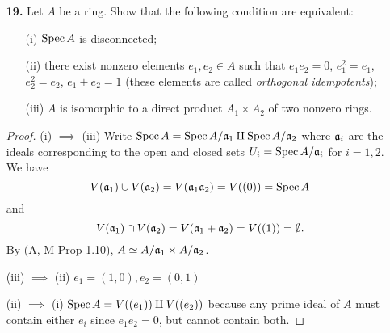 \documentclass{article}
\begin{document}
\begin{enumerate} [label=\textbf{\arabic*.}, leftmargin=0em]
\item[\textbf{19.}] Let $A$ be a ring. Show that the following condition are equivalent:
\begin{itemize}
    \item[(i)] $\operatorname{Spec}{A}$ is disconnected;
    \item[(ii)] there exist nonzero elements $e_1, e_2 \in A$ such that $e_1 e_2 = 0$, $e_1^2 = e_1$, $e_2^2 = e_2$, $e_1 + e_2 = 1$ (these elements are called \textit{orthogonal idempotents});
    \item[(iii)] $A$ is isomorphic to a direct product $A_1 \times A_2$ of two nonzero rings.
\end{itemize}

\begin{proof}
    (i) $\implies$ (iii) Write $\operatorname{Spec}{A} = \operatorname{Spec}{A/\mathfrak{a}_1} \amalg \operatorname{Spec}{A/\mathfrak{a}_2}$ where $\mathfrak{a}_i$ are the ideals corresponding to the open and closed sets $U_i = \operatorname{Spec}{A/\mathfrak{a}_i}$ for $i = 1, 2$. We have $$V(\mathfrak{a}_1) \cup V(\mathfrak{a}_2) = V(\mathfrak{a}_1 \mathfrak{a}_2 ) = V((0)) = \operatorname{Spec}{A}$$ and $$V(\mathfrak{a}_1) \cap V(\mathfrak{a}_2) = V(\mathfrak{a}_1 + \mathfrak{a}_2)= V((1)) = \emptyset.$$ By (A, M Prop 1.10), $A \simeq A/\mathfrak{a}_1 \times A/\mathfrak{a}_2$.

    (iii) $\implies$ (ii) $e_1 = (1, 0), e_2 = (0, 1)$

    (ii) $\implies$ (i) $\operatorname{Spec}{A} = V((e_1)) \amalg V((e_2))$ because any prime ideal of $A$ must contain either $e_i$ since $e_1 e_2 = 0$, but cannot contain both.
\end{proof}

\end{enumerate}
\end{document}
